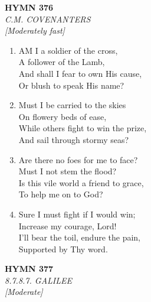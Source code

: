 \documentclass[11pt,a4paper]{article}
\begin{document}
\newpage
\begin{center}
    {\Large \textbf{HYMN 376}}
    \\
    \textit{C.M. COVENANTERS}
    \\
    \textit{\small [Moderately fast]}
\end{center}
\vspace{1em}

\begin{enumerate}
    \item AM I a soldier of the cross, \\
        A follower of the Lamb, \\
        And shall I fear to own His cause, \\
        Or blush to speak His name?

    \item Must I be carried to the skies \\
        On flowery beds of ease, \\
        While others fight to win the prize, \\
        And sail through stormy seas?

    \item Are there no foes for me to face? \\
        Must I not stem the flood? \\
        Is this vile world a friend to grace, \\
        To help me on to God?

    \item Sure I must fight if I would win; \\
        Increase my courage, Lord! \\
        I'll bear the toil, endure the pain, \\
        Supported by Thy word.

\end{enumerate}

\newpage
\begin{center}
    {\Large \textbf{HYMN 377}}
    \\
    \textit{8.7.8.7. GALILEE}
    \\
    \textit{\small [Moderate]}
\end{center}
\vspace{1em}
\end{document}
